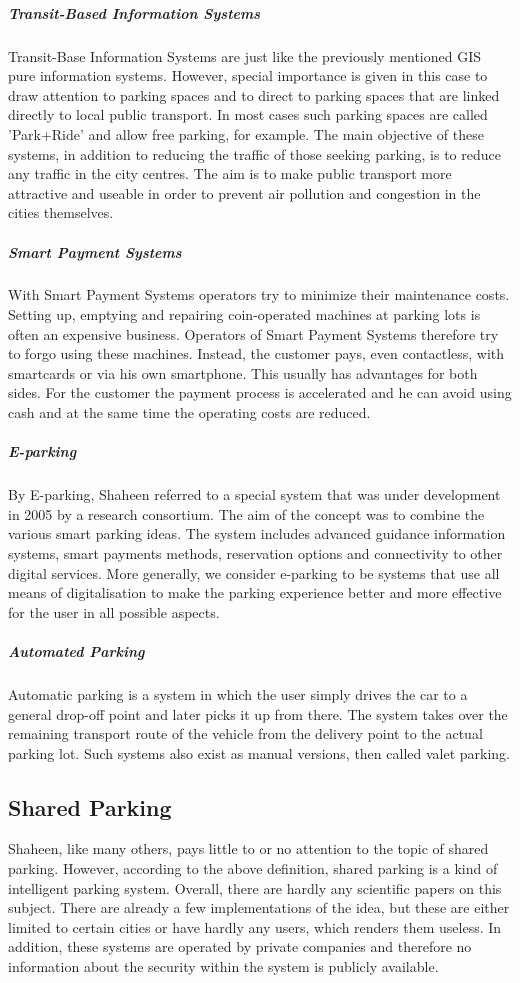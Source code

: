 \documentclass[
a4paper,     %
titlepage,   %
14pt         %
]{scrartcl}  %
\theoremstyle{mystyle}
\begin{document}
\subparagraph{Transit-Based Information Systems}
Transit-Base Information Systems are just like the previously mentioned GIS pure information systems. However, special importance is given in this case to draw attention to parking spaces and to direct to parking spaces that are linked directly to local public transport. In most cases such parking spaces are called 'Park+Ride' and allow free parking, for example. The main objective of these systems, in addition to reducing the traffic of those seeking parking, is to reduce any traffic in the city centres. The aim is to make public transport more attractive and useable in order to prevent air pollution and congestion in the cities themselves. 

\subparagraph{Smart Payment Systems}
With Smart Payment Systems operators try to minimize their maintenance costs. Setting up, emptying and repairing coin-operated machines at parking lots is often an expensive business. Operators of Smart Payment Systems therefore try to forgo using these machines. Instead, the customer pays, even contactless, with smartcards or via his own smartphone. This usually has advantages for both sides. For the customer the payment process is accelerated and he can avoid using cash and at the same time the operating costs are reduced.

\subparagraph{E-parking}
By E-parking, Shaheen referred to a special system that was under development in 2005 by a research consortium. The aim of the concept was to combine the various smart parking ideas. The system includes advanced guidance information systems, smart payments methods, reservation options and connectivity to other digital services. More generally, we consider e-parking to be systems that use all means of digitalisation to make the parking experience better and more effective for the user in all possible aspects.

\subparagraph{Automated Parking}
Automatic parking is a system in which the user simply drives the car to a general drop-off point and later picks it up from there. The system takes over the remaining transport route of the vehicle from the delivery point to the actual parking lot. Such systems also exist as manual versions, then called valet parking.

\subsection{Shared Parking}
Shaheen, like many others, pays little to or no attention to the topic of shared parking. However, according to the above definition, shared parking is a kind of intelligent parking system. Overall, there are hardly any scientific papers on this subject. There are already a few implementations of the idea, but these are either limited to certain cities or have hardly any users, which renders them useless. In addition, these systems are operated by private companies and therefore no information about the security within the system is publicly available.\\
\end{document}
